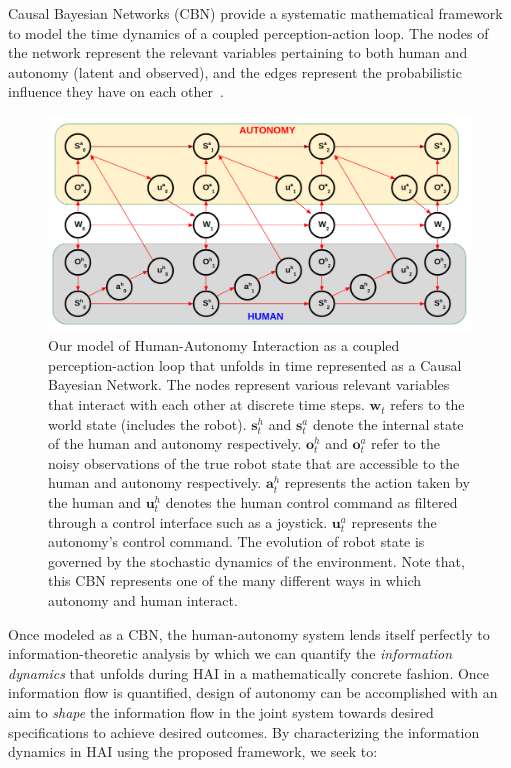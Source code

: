 \documentclass[12pt]{article}
\begin{document}
Causal Bayesian Networks (CBN) provide a systematic mathematical framework to model the time dynamics of a coupled perception-action loop. The nodes of the network represent the relevant variables pertaining to both human and autonomy (latent and observed), and the edges represent the probabilistic influence they have on each other~\cite{pearl2009causality}. 
\begin{figure}[t!]
	\includegraphics[keepaspectratio, width = 1\textwidth, center]{./figures/pa_loop.png}
	\caption{Our model of Human-Autonomy Interaction as a coupled perception-action loop that unfolds in time represented as a Causal Bayesian Network. The nodes represent various relevant variables that interact with each other at discrete time steps. $\textbf{w}_t$ refers to the world state (includes the robot). $\textbf{s}^h_t$ and $\textbf{s}^a_t$ denote the internal state of the human and autonomy respectively. $\textbf{o}^h_t$ and $\textbf{o}^a_t$ refer to the noisy observations of the true robot state that are accessible to the human and autonomy respectively. $\textbf{a}^h_t$ represents the action taken by the human and $\textbf{u}^h_t$ denotes the human control command as filtered through a control interface such as a joystick. $\textbf{u}^a_t$ represents the autonomy's control command. The evolution of robot state is governed by the stochastic dynamics of the environment. Note that, this CBN represents one of the many different ways in which autonomy and human interact.}
	\label{fig:cbn}
\end{figure}
Once modeled as a CBN, the human-autonomy system lends itself perfectly to information-theoretic analysis by which we can quantify the \textit{information dynamics} that unfolds during HAI in a mathematically concrete fashion. Once information flow is quantified, design of autonomy can be accomplished with an aim to \textit{shape} the information flow in the joint system towards desired specifications to achieve desired outcomes. By characterizing the information dynamics in HAI using the proposed framework, we seek to:
\end{document}
